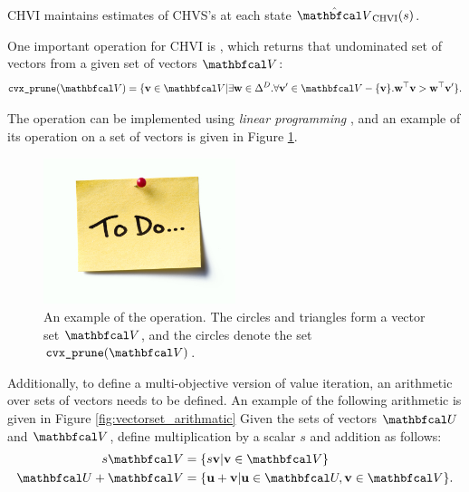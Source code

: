        CHVI maintains estimates of CHVS's at each state $\hat{\bfcl{V}}_{\chvi}(s)$.

        One important operation for CHVI is \cprune, which returns that undominated set of vectors from a given set of vectors $\bfcl{V}$:
        \begin{align}
            \cprune(\bfcl{V}) = \{\bff{v}\in\bfcl{V} | \exists \bff{w}\in\Delta^D. \forall \bff{v}'\in\bfcl{V}-\{\bff{v}\}. \bff{w}^\top \bff{v} > \bff{w}^\top \bff{v}' \}.
        \end{align}

        The \cprune\ewe operation can be implemented using \textit{linear programming} , and an example of its operation on a set of vectors is given in Figure \ref{fig:convex_prune}.

        \begin{figure}
            \centering\includegraphics[width=0.5\textwidth]{figures/todo.jpg} 
            \caption[An example of the \cprune\ewe operation.]{An example of the \cprune\ewe operation. The circles and triangles form a vector set $\bfcl{V}$, and the circles denote the set $\cprune(\bfcl{V})$.}
            \label{fig:convex_prune}
        \end{figure}

        Additionally, to define a multi-objective version of value iteration, an arithmetic over sets of vectors needs to be defined. An example of the following arithmetic is given in Figure \ref{fig:vectorset_arithmatic} Given the sets of vectors $\bfcl{U}$ and $\bfcl{V}$, define multiplication by a scalar $s$ and addition as follows:
        \begin{align}
            s\bfcl{V} &= \{s\bff{v} | \bff{v}\in\bfcl{V} \} \\
            \bfcl{U} + \bfcl{V} &= \{ \bff{u}+\bff{v} | \bff{u}\in\bfcl{U}, \bff{v}\in\bfcl{V} \}.
        \end{align}

